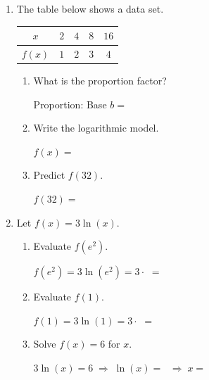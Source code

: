 \documentclass[10pt]{article}
\begin{document}
\namedateperiod

\vspace{0.15in}

\begin{enumerate}[leftmargin=1.8em, itemsep=18pt]

\item The table below shows a data set.

\vspace{6pt}
\begin{center}
\renewcommand{\arraystretch}{1.8}
\begin{tabular}{|c|c|c|c|c|}
\hline
\rowcolor{sky}
$x$    & $2$ & $4$ & $8$ & $16$ \\
\hline
$f(x)$ & $1$ & $2$ & $3$ & $4$ \\
\hline
\end{tabular}
\end{center}

\begin{enumerate}[leftmargin=1.5em, itemsep=8pt, label=\alph*.]
  \item What is the proportion factor?

  \vspace{4pt}
  Proportion:  \qquad Base $b = $ 

  \item Write the logarithmic model.

  \vspace{4pt}
  $f(x) = $ 

  \item Predict $f(32)$.

  \vspace{4pt}
  $f(32) = $ 
\end{enumerate}

\item Let $f(x) = 3\ln(x)$.

\begin{enumerate}[leftmargin=1.5em, itemsep=8pt, label=\alph*.]
  \item Evaluate $f(e^2)$.

  \vspace{4pt}
  $f(e^2) = 3\ln(e^2) = 3 \cdot $  $= $ 

  \item Evaluate $f(1)$.

  \vspace{4pt}
  $f(1) = 3\ln(1) = 3 \cdot $  $= $ 

  \item Solve $f(x) = 6$ for $x$.

  \vspace{4pt}
  $3\ln(x) = 6 \;\Rightarrow\; \ln(x) = $  $\;\Rightarrow\; x = $ 
\end{enumerate}

\end{enumerate}
\end{document}

